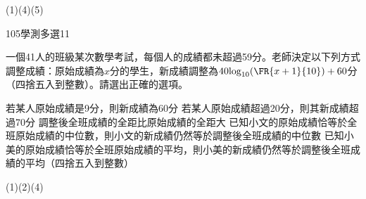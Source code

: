 \begin{QUESTIONS}
\begin{QUESTION}
\begin{QBODY}
\begin{QOPS}
			\end{QOPS}
        \end{QBODY}
        \begin{QFROMS}
        \end{QFROMS}
        \begin{QTAGS}\end{QTAGS}
        \begin{QANS}
            (1)(4)(5)
        \end{QANS}
        \begin{QSOLLIST}
        \end{QSOLLIST}
        \begin{QEMPTYSPACE}
        \end{QEMPTYSPACE}
    \end{QUESTION}
    \begin{QUESTION}
        \begin{ExamInfo}{105}{學測}{多選}{11}
        \end{ExamInfo}
        \begin{ExamAnsRateInfo}{47}{67}{49}{25}
        \end{ExamAnsRateInfo}
        \begin{QBODY}
            一個41人的班級某次數學考試，每個人的成績都未超過59分。老師決定以下列方式調整成績：原始成績為$x$分的學生，新成績調整為$40{{\log }_{10}}(\FR{x+1}{10})+60$分（四捨五入到整數）。請選出正確的選項。
			\begin{QOPS}
				\QOP 若某人原始成績是9分，則新成績為60分
				\QOP 若某人原始成績超過20分，則其新成績超過70分
				\QOP 調整後全班成績的全距比原始成績的全距大
				\QOP 已知小文的原始成績恰等於全班原始成績的中位數，則小文的新成績仍然等於調整後全班成績的中位數
				\QOP 已知小美的原始成績恰等於全班原始成績的平均，則小美的新成績仍然等於調整後全班成績的平均（四捨五入到整數）
			\end{QOPS}
        \end{QBODY}
        \begin{QFROMS}
        \end{QFROMS}
        \begin{QTAGS}\end{QTAGS}
        \begin{QANS}
            (1)(2)(4)
        \end{QANS}
        \begin{QSOLLIST}
        \end{QSOLLIST}

\end{QUESTION}
\end{QUESTIONS}
